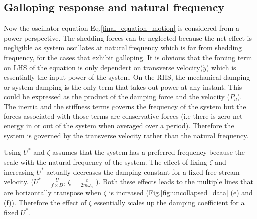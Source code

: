 \subsection{Galloping response and natural frequency}
 
 Now the oscillator equation Eq.\eqref{final_equation_motion} is considered from a power perspective. The shedding forces can be neglected because the net effect is negligible as system oscillates at natural frequency which is far from shedding frequency, for the cases that exhibit galloping. It is obvious that the forcing term on LHS of the equation is only dependent on transverse velocity($\dot{y}$) which is essentially the input power of the system. On the RHS, the mechanical damping or system damping is the only term that takes out power at any instant. This could be expressed as the product of the damping force and the velocity ($P_d$). The inertia and the stiffness terms governs the frequency of the system but the forces associated with those terms are conservative forces (i.e there is zero net energy in or out of the system when averaged over a period). Therefore the system is governed by the transverse velocity rather than the natural frequency.
 

 Using $U^*$ and $\zeta$ assumes that the system has a preferred frequency because the scale with the natural frequency of the system. The effect of fixing $\zeta$ and increasing $U^*$ actually decreases the damping constant for a fixed free-stream velocity. ($U^*=\frac{U}{f \times D}$, $\zeta= \frac{c}{2 m \omega_n}$ ). Both these effects leads to the multiple lines that are horizontally transpose when $\zeta$ is increased (Fig.\ref{fig:uncollapsed_data} (e) and (f)). Therefore the effect of $\zeta$ essentially scales up the damping coefficient for a fixed $U^*$.
 
